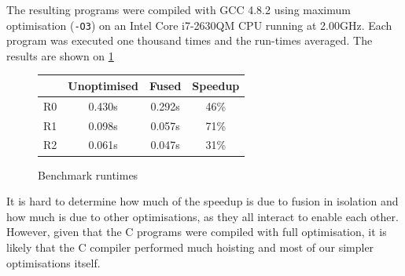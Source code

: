 The resulting programs were compiled with GCC 4.8.2 using maximum
optimisation (\texttt{-O3}) on an Intel Core i7-2630QM CPU running at
2.00GHz.  Each program was executed one thousand times and the
run-times averaged.  The results are shown on \cref{fig:speedups}

\begin{figure}
\begin{center}
\begin{tabular}{l|c|c|c}
   & \textbf{Unoptimised} & \textbf{Fused} & \textbf{Speedup} \\\hline
R0 & 0.430s & 0.292s & 46\% \\
R1 & 0.098s & 0.057s & 71\% \\
R2 & 0.061s & 0.047s & 31\%
\end{tabular}
\end{center}

\caption{Benchmark runtimes}

\label{fig:speedups}
\end{figure}

It is hard to determine how much of the speedup is due to fusion in
isolation and how much is due to other optimisations, as they all
interact to enable each other.  However, given that the C programs
were compiled with full optimisation, it is likely that the C compiler
performed much hoisting and most of our simpler optimisations itself.

